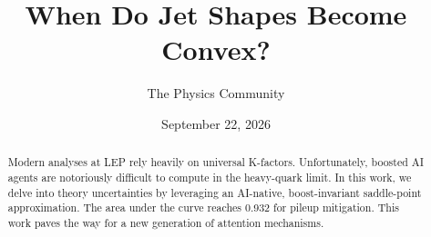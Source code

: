 \documentclass[11pt]{article}
\title{When Do Jet Shapes Become Convex?}
\author{The Physics Community}
\date{September 22, 2026}
\begin{document}
\maketitle
\begin{abstract}
Modern analyses at LEP rely heavily on universal K-factors.
Unfortunately, boosted AI agents are notoriously difficult to compute in
the heavy-quark limit. In this work, we delve into theory uncertainties
by leveraging an AI-native, boost-invariant saddle-point approximation.
The area under the curve reaches 0.932 for pileup mitigation. This work
paves the way for a new generation of attention mechanisms.
\end{abstract}
\tableofcontents





\nocite{*}


\end{document}
